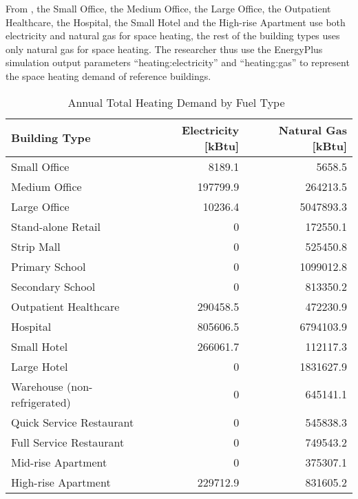 From , the Small Office, the Medium Office, the Large Office,
the Outpatient Healthcare, the Hospital, the Small Hotel and the High-rise Apartment
use both electricity and natural gas for space heating, the rest of
the building types uses only natural gas for space heating. The researcher thus use
the EnergyPlus simulation output parameters ``heating:electricity''
and ``heating:gas'' to represent the space heating demand of reference
buildings.
\begin{table}[h]
\centering
\caption{Annual Total Heating Demand by Fuel Type~\cite{DOE2015}}
\label{tab:heatFuel}
\begin{tabular}{lrr}
  \hline
  Building Type                & Electricity {[}kBtu{]} & Natural Gas {[}kBtu{]} \\
  \hline
  \hline
  
  Small Office                 & 8189.1                 & 5658.5                 \\
  Medium Office                & 197799.9               & 264213.5               \\
  Large Office                 & 10236.4                & 5047893.3              \\
  Stand-alone Retail           & 0                      & 172550.1               \\
  Strip Mall                   & 0                      & 525450.8               \\
  Primary School               & 0                      & 1099012.8              \\
  Secondary School             & 0                      & 813350.2               \\
  Outpatient Healthcare        & 290458.5               & 472230.9               \\
  Hospital                     & 805606.5               & 6794103.9              \\
  Small Hotel                  & 266061.7               & 112117.3               \\
  Large Hotel                  & 0                      & 1831627.9              \\
  Warehouse (non-refrigerated) & 0                      & 645141.1               \\
  Quick Service Restaurant     & 0                      & 545838.3               \\
  Full Service Restaurant      & 0                      & 749543.2               \\
  Mid-rise Apartment           & 0                      & 375307.1               \\
  High-rise Apartment          & 229712.9               & 831605.2               \\
  \hline
\end{tabular}
\end{table}

